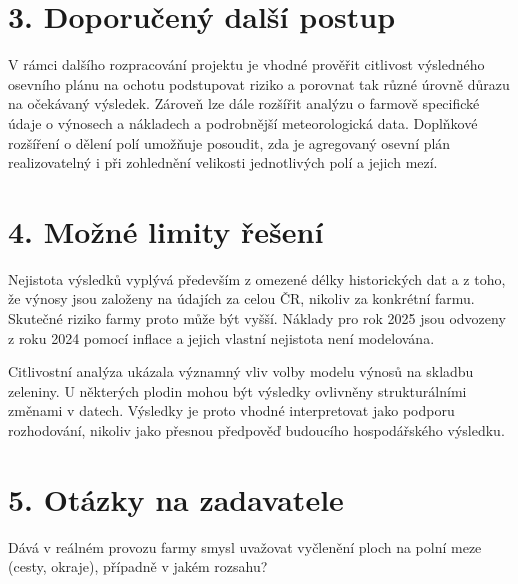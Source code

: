 \documentclass[11pt,a4paper]{article}
\begin{document}
\vspace{-0.2cm}

\section*{3. Doporučený další postup}

V rámci dalšího rozpracování projektu je vhodné prověřit citlivost výsledného osevního plánu na ochotu podstupovat riziko a porovnat tak různé úrovně důrazu na očekávaný výsledek. Zároveň lze dále rozšířit analýzu o farmově specifické údaje o výnosech a nákladech a podrobnější meteorologická data. Doplňkové rozšíření o dělení polí umožňuje posoudit, zda je agregovaný osevní plán realizovatelný i při zohlednění velikosti jednotlivých polí a jejich mezí.

\vspace{-0.2cm}

\section*{4. Možné limity řešení}

Nejistota výsledků vyplývá především z omezené délky historických dat a z
toho, že výnosy jsou založeny na údajích za celou ČR, nikoliv za konkrétní
farmu. Skutečné riziko farmy proto může být vyšší. Náklady pro rok 2025
jsou odvozeny z roku 2024 pomocí inflace a jejich vlastní nejistota není
modelována.

Citlivostní analýza ukázala významný vliv volby modelu výnosů na skladbu
zeleniny. U některých plodin mohou být výsledky ovlivněny strukturálními
změnami v datech. Výsledky je proto vhodné interpretovat jako podporu rozhodování, nikoliv jako přesnou předpověď budoucího hospodářského výsledku.

\vspace{-0.2cm}

\section*{5. Otázky na zadavatele}

Dává v reálném provozu farmy smysl uvažovat vyčlenění ploch na polní meze (cesty, okraje), případně v jakém rozsahu?
\end{document}
